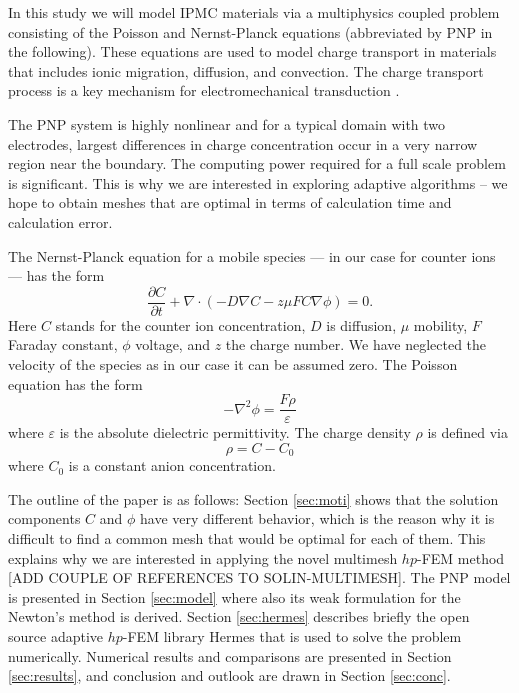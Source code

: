 \newpage

In this study we will model IPMC materials via a multiphysics coupled problem 
consisting of the Poisson and Nernst-Planck equations (abbreviated by PNP in
the following). These equations are used to model charge transport in materials 
that includes ionic migration, diffusion, and convection. The charge transport 
process is a key mechanism for electromechanical transduction 
\cite{basu1997membrane,shahinpoor2001smartmat,
nasser2002applied,newbury2003intelligent, wallmersperger2007appliedphysics,
pugal2008appliedphysics,pugal2010polymer}.

The PNP system is highly nonlinear and for a typical domain with two
electrodes, largest differences in charge concentration occur in a very narrow
region near the boundary. The computing power required for a full scale problem 
is significant. This is why we are interested in exploring adaptive algorithms
-- we hope to obtain meshes that are optimal in terms of calculation time and 
calculation error.

The Nernst-Planck equation for a mobile species ---
in our case for counter ions --- has the form
\begin{equation}
  \frac{\partial C}{\partial t}+\nabla\cdot(-D\nabla C-z\mu FC\nabla\phi)=0.
  \label{eq:nernst-planck}
\end{equation}
Here $C$ stands for the counter ion concentration, $D$ is diffusion, $\mu$ mobility,
$F$ Faraday constant, $\phi$ voltage, and $z$ the charge number. We have neglected 
the velocity of the species as in our case it can be assumed zero. 
The Poisson equation has the form
\begin{equation}
  -\nabla^2\phi=\frac{F\rho}{\varepsilon}
  \label{eq:poisson}
\end{equation}
where $\varepsilon$ is the absolute dielectric permittivity. The
charge density $\rho$ is defined via
\begin{equation}
  \rho=C-C_{0}
  \label{eq:rho}
\end{equation}
where $C_{0}$ is a constant anion concentration.

The outline of the paper is as follows: Section \ref{sec:moti} shows that 
the solution components $C$ and $\phi$ have very different behavior, which
is the reason why it is difficult to find a common mesh that would be optimal 
for each of them. This explains why we are interested in applying the novel
multimesh $hp$-FEM method [ADD COUPLE OF REFERENCES TO SOLIN-MULTIMESH].
The PNP model is presented in Section \ref{sec:model} where also its weak 
formulation for the Newton's method is derived. Section \ref{sec:hermes}
describes briefly the open source adaptive $hp$-FEM library Hermes
that is used to solve the problem numerically. 
Numerical results and comparisons are presented in Section \ref{sec:results},
and conclusion and outlook are drawn in Section \ref{sec:conc}.



